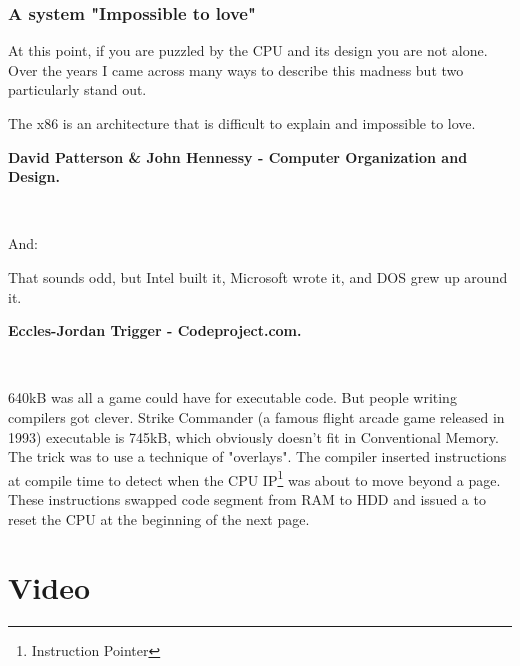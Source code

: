 \documentclass[book.tex]{subfiles}
\begin{document}
\subsubsection{A system "Impossible to love"}
At this point, if you are puzzled by the CPU and its design you are not alone. Over the years I came across many ways to describe this madness but two particularly stand out.\\
\par
 \begin{fancyquotes}
   The x86 is an architecture that is difficult to explain and impossible to love.\\
   \par
\textbf{David Patterson \& John Hennessy - Computer Organization and Design.}
 \end{fancyquotes}\\
\par
And:\\
\par
 \begin{fancyquotes}
    That sounds odd, but Intel built it, Microsoft wrote it, and DOS grew up around it.\\
   \par
\textbf{Eccles-Jordan Trigger - Codeproject.com.}
 \end{fancyquotes}\\



\par
{} 640kB was all a game could have for executable code. But people writing compilers got clever. Strike Commander (a famous flight arcade game released in 1993) executable is 745kB, which obviously doesn't fit in Conventional Memory. The trick was to use a technique of "overlays". The compiler inserted instructions at compile time to detect when the CPU IP\footnote{Instruction Pointer} was about to move beyond a page. These instructions swapped code segment from RAM to HDD and issued a  to reset the CPU at the beginning of the next page.

















\section{Video}
\end{document}

